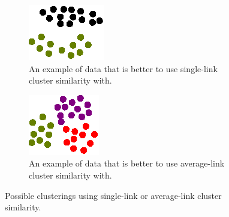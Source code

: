 \documentclass[12pt]{ucthesis}
\begin{document}
         \begin{figure}[t]
            \centering
            \begin{subfigure}[t]{0.45\textwidth}
               \centering
               \includegraphics[width=\textwidth]{graphics/good_single_link.eps}
               \caption{An example of data that is better to use single-link
                        cluster similarity with.}
               \label{fig:good_single_link}
            \end{subfigure}
            \hfill
            \begin{subfigure}[t]{0.45\textwidth}
               \centering
               \includegraphics[width=\textwidth]{graphics/bad_single_link.eps}
               \caption{An example of data that is better to use average-link
                        cluster similarity with.}
               \label{fig:bad_single_link}
            \end{subfigure}
            \caption{Possible clusterings using single-link or average-link
                     cluster similarity.}
            \label{fig:single_average_link}
         \end{figure}
\end{document}
